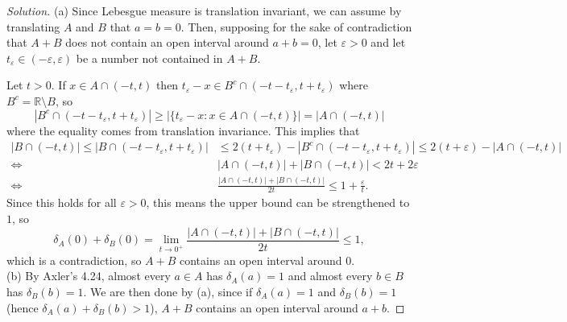 \documentclass[10pt]{article}
\providecommand{\eps}{\varepsilon}
\providecommand{\RR}{\mathbb R}
\newenvironment{soln}{\begin{proof}[Solution]}{\end{proof}}
\providecommand{\abs}[1]{\left\lvert #1\right\rvert}
\begin{document}
\begin{soln}
    (a) Since Lebesgue measure is translation invariant,
    we can assume by translating $A$ and $B$ that $a=b=0$.
    Then, supposing for the sake of contradiction that
    $A+B$ does not contain an open interval around $a+b=0$,
    let $\eps>0$ and let $t_\eps\in (-\eps,\eps)$
    be a number not contained in $A+B$.
    
    Let $t > 0$. If $x\in A\cap(-t,t)$ then
    $t_\eps - x\in B^c\cap (-t-t_\eps, t+t_\eps)$
    where $B^c = \RR\setminus B$, so
    \begin{equation*}
	\abs{B^c\cap(-t-t_\eps,t+t_\eps)}
	\ge \abs{\{t_\eps - x : x\in A\cap(-t,t)\}}
	= \abs{A\cap (-t,t)}
    \end{equation*}
    where the equality comes from translation invariance.
    This implies that
    \begin{align*}
	\abs{B\cap (-t,t)}
	\le \abs{B\cap(-t-t_\eps, t+t_\eps)}
	&\le 2(t+t_\eps) - \abs{B^c\cap(-t-t_\eps, t+t_\eps)}
	\le 2(t+\eps) - \abs{A\cap(-t,t)}\\
	\iff &\abs{A\cap(-t,t)} + \abs{B\cap(-t,t)} < 2t + 2\eps\\
	\iff &\frac{\abs{A\cap(-t,t)} + \abs{B\cap(-t,t)}}{2t} \le 1 + \frac\eps t.
    \end{align*}
    Since this holds for all $\eps>0$, this means the upper bound
    can be strengthened to $1$, so
    \begin{equation*}
	\delta_A(0) + \delta_B(0)
	= \lim_{t\to 0^+} \frac{\abs{A\cap(-t,t)} + \abs{B\cap(-t,t)}}{2t}
	\le 1,
    \end{equation*}
    which is a contradiction, so $A+B$ contains an open interval around $0$.
    \\

    (b) By Axler's 4.24, almost every $a\in A$ has $\delta_A(a) = 1$
    and almost every $b\in B$ has $\delta_B(b) = 1$.
    We are then done by (a), since if $\delta_A(a) = 1$ and $\delta_B(b) = 1$
    (hence $\delta_A(a) + \delta_B(b) > 1$),
    $A+B$ contains an open interval around $a+b$.
\end{soln}
\end{document}

